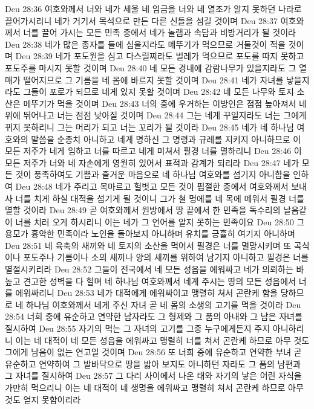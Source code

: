 Deu 28:36  여호와께서 너와 네가 세울 네 임금을 너와 네 열조가 알지 못하던 나라로 끌어가시리니 네가 거기서 목석으로 만든 다른 신들을 섬길 것이며
Deu 28:37  여호와께서 너를 끌어 가시는 모든 민족 중에서 네가 놀램과 속담과 비방거리가 될 것이라
Deu 28:38  네가 많은 종자를 들에 심을지라도 메뚜기가 먹으므로 거둘것이 적을 것이며
Deu 28:39  네가 포도원을 심고 다스릴찌라도 벌레가 먹으므로 포도를 따지 못하고 포도주를 마시지 못할 것이며
Deu 28:40  네 모든 경내에 감람나무가 있을지라도 그 열매가 떨어지므로 그 기름을 네 몸에 바르지 못할 것이며
Deu 28:41  네가 자녀를 낳을지라도 그들이 포로가 되므로 네게 있지 못할 것이며
Deu 28:42  네 모든 나무와 토지 소산은 메뚜기가 먹을 것이며
Deu 28:43  너의 중에 우거하는 이방인은 점점 높아져서 네 위에 뛰어나고 너는 점점 낮아질 것이며
Deu 28:44  그는 네게 꾸일지라도 너는 그에게 뀌지 못하리니 그는 머리가 되고 너는 꼬리가 될 것이라
Deu 28:45  네가 네 하나님 여호와의 말씀을 순종치 아니하고 네게 명하신 그 명령과 규례를 지키지 아니하므로 이 모든 저주가 네게 임하고 너를 따르고 네게 미쳐서 필경 너를 멸하리니
Deu 28:46  이 모든 저주가 너와 네 자손에게 영원히 있어서 표적과 감계가 되리라
Deu 28:47  네가 모든 것이 풍족하여도 기쁨과 즐거운 마음으로 네 하나님 여호와를 섬기지 아니함을 인하여
Deu 28:48  네가 주리고 목마르고 헐벗고 모든 것이 핍절한 중에서 여호와께서 보내사 너를 치게 하실 대적을 섬기게 될 것이니 그가 철 멍에를 네 목에 메워서 필경 너를 멸할 것이라
Deu 28:49  곧 여호와께서 원방에서 땅 끝에서 한 민족을 독수리의 날음같이 너를 치러 오게 하시리니 이는 네가 그 언어를 알지 못하는 민족이요
Deu 28:50  그 용모가 흉악한 민족이라 노인을 돌아보지 아니하며 유치를 긍휼히 여기지 아니하며
Deu 28:51  네 육축의 새끼와 네 토지의 소산을 먹어서 필경은 너를 멸망시키며 또 곡식이나 포도주나 기름이나 소의 새끼나 양의 새끼를 위하여 남기지 아니하고 필경은 너를 멸절시키리라
Deu 28:52  그들이 전국에서 네 모든 성읍을 에워싸고 네가 의뢰하는 바 높고 견고한 성벽을 다 헐며 네 하나님 여호와께서 네게 주시는 땅의 모든 성읍에서 너를 에워싸리니
Deu 28:53  네가 대적에게 에워싸이고 맹렬히 쳐서 곤란케 함을 당하므로 네 하나님 여호와께서 네게 주신 자녀 곧 네 몸의 소생의 고기를 먹을 것이라
Deu 28:54  너희 중에 유순하고 연약한 남자라도 그 형제와 그 품의 아내와 그 남은 자녀를 질시하여
Deu 28:55  자기의 먹는 그 자녀의 고기를 그중 누구에게든지 주지 아니하리니 이는 네 대적이 네 모든 성읍을 에워싸고 맹렬히 너를 쳐서 곤란케 하므로 아무 것도 그에게 남음이 없는 연고일 것이며
Deu 28:56  또 너희 중에 유순하고 연약한 부녀 곧 유순하고 연약하여 그 발바닥으로 땅을 밟아 보지도 아니하던 자라도 그 품의 남편과 그 자녀를 질시하여
Deu 28:57  그 다리 사이에서 나온 태와 자기의 낳은 어린 자식을 가만히 먹으리니 이는 네 대적이 네 생명을 에워싸고 맹렬히 쳐서 곤란케 하므로 아무 것도 얻지 못함이리라
